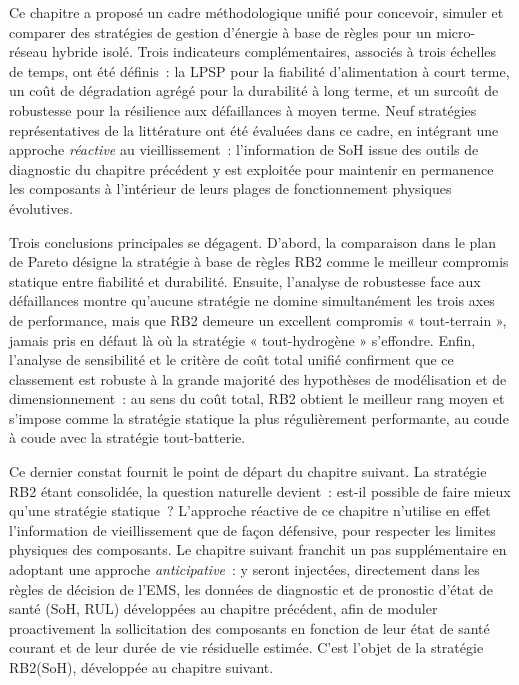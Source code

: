 Ce chapitre a proposé un cadre méthodologique unifié pour concevoir, simuler et comparer des stratégies de gestion d'énergie à base de règles pour un micro-réseau hybride isolé. Trois indicateurs complémentaires, associés à trois échelles de temps, ont été définis~: la LPSP pour la fiabilité d'alimentation à court terme, un coût de dégradation agrégé pour la durabilité à long terme, et un surcoût de robustesse pour la résilience aux défaillances à moyen terme. Neuf stratégies représentatives de la littérature ont été évaluées dans ce cadre, en intégrant une approche \emph{réactive} au vieillissement~: l'information de SoH issue des outils de diagnostic du chapitre précédent y est exploitée pour maintenir en permanence les composants à l'intérieur de leurs plages de fonctionnement physiques évolutives.

Trois conclusions principales se dégagent. D'abord, la comparaison dans le plan de Pareto désigne la stratégie à base de règles RB2 comme le meilleur compromis statique entre fiabilité et durabilité. Ensuite, l'analyse de robustesse face aux défaillances montre qu'aucune stratégie ne domine simultanément les trois axes de performance, mais que RB2 demeure un excellent compromis « tout-terrain », jamais pris en défaut là où la stratégie « tout-hydrogène » s'effondre. Enfin, l'analyse de sensibilité et le critère de coût total unifié confirment que ce classement est robuste à la grande majorité des hypothèses de modélisation et de dimensionnement~: au sens du coût total, RB2 obtient le meilleur rang moyen et s'impose comme la stratégie statique la plus régulièrement performante, au coude à coude avec la stratégie tout-batterie.

Ce dernier constat fournit le point de départ du chapitre suivant. La stratégie RB2 étant consolidée, la question naturelle devient~: est-il possible de faire mieux qu'une stratégie statique~? L'approche réactive de ce chapitre n'utilise en effet l'information de vieillissement que de façon défensive, pour respecter les limites physiques des composants. Le chapitre suivant franchit un pas supplémentaire en adoptant une approche \emph{anticipative}~: y seront injectées, directement dans les règles de décision de l'EMS, les données de diagnostic et de pronostic d'état de santé (SoH, RUL) développées au chapitre précédent, afin de moduler proactivement la sollicitation des composants en fonction de leur état de santé courant et de leur durée de vie résiduelle estimée. C'est l'objet de la stratégie RB2(SoH), développée au chapitre suivant.
